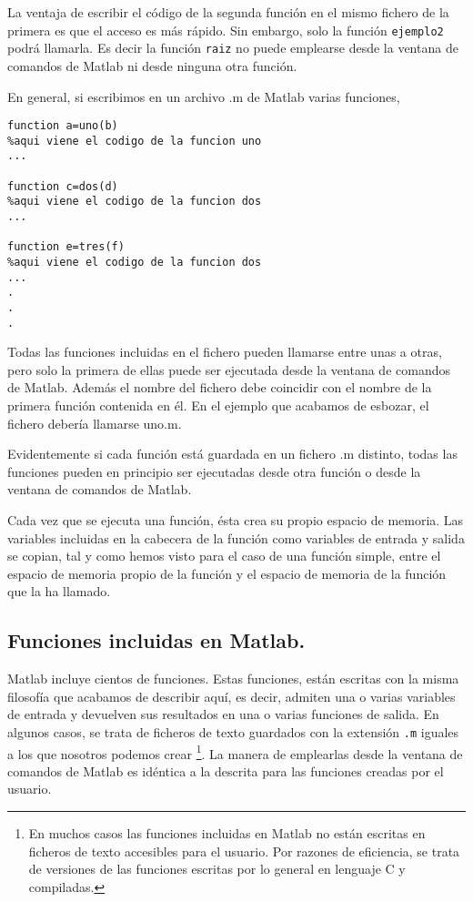 La ventaja de escribir el código de la segunda función en el mismo fichero de la primera es que el acceso es más rápido. Sin embargo, solo la función \texttt{ejemplo2} podrá llamarla. Es decir la función \texttt{raiz} no puede emplearse desde la ventana de comandos de Matlab  ni desde ninguna otra función.

En general, si escribimos en un archivo .m de Matlab varias funciones,

\begin{verbatim}
function a=uno(b)
%aqui viene el codigo de la funcion uno
...

function c=dos(d)
%aqui viene el codigo de la funcion dos
...

function e=tres(f)
%aqui viene el codigo de la funcion dos
...
.
.
.
\end{verbatim}

Todas las funciones incluidas en el fichero pueden llamarse entre unas a otras, pero solo la primera de ellas puede ser ejecutada desde la ventana de comandos de Matlab. Además el nombre del fichero debe coincidir con el nombre de la primera función  contenida en él. En el ejemplo que acabamos de esbozar, el fichero debería llamarse uno.m.

Evidentemente si cada función está guardada en un fichero .m distinto, todas las funciones pueden en principio ser ejecutadas desde otra función o desde la ventana de comandos de Matlab.

Cada vez que se ejecuta una función, ésta crea su propio espacio de memoria. Las variables incluidas en la cabecera de la función como variables de entrada y salida se copian, tal y como hemos visto para el caso de una función simple, entre el espacio de memoria propio de la función y el espacio de memoria de la función que la ha llamado.

  
\subsection{Funciones incluidas en Matlab.} 
Matlab incluye cientos de funciones. Estas funciones, están escritas con la misma filosofía que acabamos de describir aquí, es decir, admiten una o varias variables de entrada y devuelven sus resultados en una o varias funciones de salida. En algunos casos, se trata de ficheros de texto  guardados con la extensión \texttt{.m} iguales a los que nosotros podemos crear \footnote{En muchos casos las funciones incluidas en Matlab no están escritas en ficheros de texto accesibles para el usuario. Por razones de eficiencia, se trata de versiones de las funciones escritas por lo general en lenguaje C y compiladas.}. La manera de emplearlas desde la ventana de comandos de Matlab es idéntica a la descrita para las funciones creadas por el usuario. 

